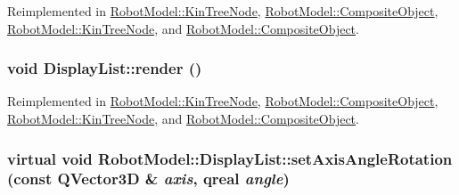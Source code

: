 Reimplemented in \hyperlink{class_robot_model_1_1_kin_tree_node_a85f4364980f9144471b9d92e175c539e}{RobotModel::KinTreeNode}, \hyperlink{class_robot_model_1_1_composite_object_aee43da74b22f6272736844effe7a1dd6}{RobotModel::CompositeObject}, \hyperlink{class_robot_model_1_1_kin_tree_node_a7ccf98213f418d0e5efa4f699d898f2d}{RobotModel::KinTreeNode}, and \hyperlink{class_robot_model_1_1_composite_object_a580d00dd3a303972d34183c07625aed7}{RobotModel::CompositeObject}.\hypertarget{class_robot_model_1_1_display_list_a5f95e85c192a2bc8f06f18075e6fefd7}{
\subsubsection[{render}]{\setlength{\rightskip}{0pt plus 5cm}void DisplayList::render ()}}
\label{class_robot_model_1_1_display_list_a5f95e85c192a2bc8f06f18075e6fefd7}


Reimplemented in \hyperlink{class_robot_model_1_1_kin_tree_node_a85f4364980f9144471b9d92e175c539e}{RobotModel::KinTreeNode}, \hyperlink{class_robot_model_1_1_composite_object_aee43da74b22f6272736844effe7a1dd6}{RobotModel::CompositeObject}, \hyperlink{class_robot_model_1_1_kin_tree_node_a7ccf98213f418d0e5efa4f699d898f2d}{RobotModel::KinTreeNode}, and \hyperlink{class_robot_model_1_1_composite_object_a580d00dd3a303972d34183c07625aed7}{RobotModel::CompositeObject}.\hypertarget{class_robot_model_1_1_display_list_a56a652740c494995c0ff55d1a5fd896d}{
\subsubsection[{setAxisAngleRotation}]{\setlength{\rightskip}{0pt plus 5cm}virtual void RobotModel::DisplayList::setAxisAngleRotation (const QVector3D \& {\em axis}, \/  qreal {\em angle})}}
\label{class_robot_model_1_1_display_list_a56a652740c494995c0ff55d1a5fd896d}


